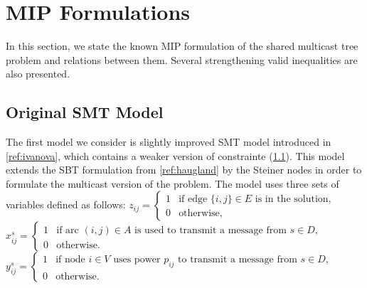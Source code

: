 \section{MIP Formulations}
\label{sec:1}
In this section, we state the known MIP formulation of the shared multicast tree problem and relations between them. Several strengthening valid inequalities are also presented.
\subsection{Original SMT Model}
The first model we consider is slightly improved SMT model introduced in \ref{ref:ivanova}, which contains a weaker version of constrainte (\ref{}). This model extends the SBT formulation from \ref{ref:haugland} by the Steiner nodes in order to formulate the multicast version of the problem. The model uses three sets of variables defined as follows:
\newline\newline
  $z_{ij}=
	\begin{cases}
    1 & \text{if edge $\{i,j\} \in E$ is in the solution},\\
    0 & \text{otherwise},
  \end{cases}$
\newline\newline
  $x^{s}_{ij}=
	\begin{cases}
    1 & \text{if arc $(i,j) \in A$ is used to transmit a message from $s\in D$},\\
    0 & \text{otherwise}.
  \end{cases}$
  \newline\newline
  $y^s_{ij}=
	\begin{cases}
    1 & \text{if node $i \in V$ uses power $p_{ij}$ to transmit a message from $s\in D$},\\
    0 & \text{otherwise}.
  \end{cases}$
\newline
\newline    
